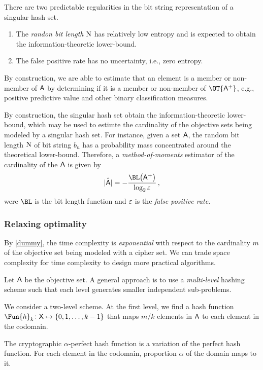 \documentclass[ ../main.tex]{subfiles}
\begin{document}
There are two predictable regularities in the bit string representation of a singular hash set.
\begin{enumerate}
	\item The \emph{randon bit length} $\mathrm{N}$ has relatively low entropy and is expected to obtain the information-theoretic lower-bound.
	\item The false positive rate has no uncertainty, i.e., zero entropy.
\end{enumerate}

By construction, we are able to estimate that an element is a member or non-member of $\Set{A}$ by determining if it is a member or non-member of $\OT{\PASet{A}}$, e.g., positive predictive value and other binary classification measures.

By construction, the singular hash set obtain the information-theoretic lower-bound, which may be used to estimte the cardinality of the objective sets being modeled by a singular hash set.
For instance, given a set $\Set{A}$, the random bit length $\mathrm{N}$ of bit string $b_n$ has a probability mass concentrated around the theoretical lower-bound.
Therefore, a \emph{method-of-moments} estimator of the cardinality of the $\Set{A}$ is given by
\begin{equation}
    \hat{\Card{\Set{A}}} = -\frac{\BL\!\left(\PASet{A}\right)}{\log_2 \fprate}\,,
\end{equation}
were $\BL$ is the bit length function and $\varepsilon$ is the \emph{false positive rate}.




\subsubsection{Relaxing optimality}
By \cref{dummy}, the time complexity is \emph{exponential} with respect to the cardinality $m$ of the objective set being modeled with a cipher set.
We can trade space complexity for time complexity to design more practical algorithms.

Let $\Set{A}$ be the objective set.
A general approach is to use a \emph{multi-level} hashing scheme such that each level generates smaller independent sub-problems.

We consider a two-level scheme.
At the first level, we find a hash function $\Fun{h}_k \colon \Set{X} \mapsto \{0,1,\ldots,k-1\}$ that maps $m/k$ elements in $\Set{A}$ to each element in the codomain.

\begin{definition}
The cryptographic $\alpha$-perfect hash function is a variation of the perfect hash function.
For each element in the codomain, proportion $\alpha$ of the domain maps to it.
\end{definition}
\end{document}

